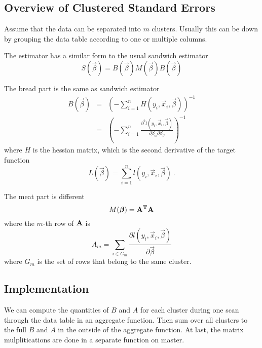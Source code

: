 \subsection{Overview of Clustered Standard Errors}

Assume that the data can be separated into $m$ clusters. Usually this
can be down by grouping the data table according to one or multiple
columns.

The estimator has a similar form to the usual sandwich estimator
\begin{equation}
  S(\vec{\beta}) = B(\vec{\beta}) M(\vec{\beta}) B(\vec{\beta})
\end{equation}

The bread part is the same as sandwich estimator
\begin{eqnarray}
  B(\vec{\beta}) & = & \left(-\sum_{i=1}^{n} H(y_i, \vec{x}_i,
    \vec{\beta})\right)^{-1}\\
  & = & \left(-\sum_{i=1}^{n}\frac{\partial^2 l(y_i, \vec{x}_i,
      \vec{\beta})}{\partial \beta_\alpha \partial \beta_\beta}\right)^{-1}
\end{eqnarray}
where $H$ is the hessian matrix, which is the second derivative of the
target function
\begin{equation}
  L(\vec{\beta}) = \sum_{i=1}^n l(y_i, \vec{x}_i, \vec{\beta})\ .
\end{equation}

The meat part is different
\begin{equation}
  M(\vec{\beta}) = \bf{A}^T\bf{A}
\end{equation}
where the $m$-th row of $\bf{A}$ is
\begin{equation}
  A_m = \sum_{i\in G_m}\frac{\partial
      l(y_i,\vec{x}_i,\vec{\beta})}{\partial \vec{\beta}}
\end{equation}
where $G_m$ is the set of rows that belong to the same cluster.

\subsection{Implementation}

We can compute the quantities of $B$ and $A$ for each cluster during one scan through
the data table in an aggregate function. Then sum over all clusters to
the full $B$ and $A$ in the outside of the aggregate function. At last, the matrix mulplitications
are done in a separate function on master.
